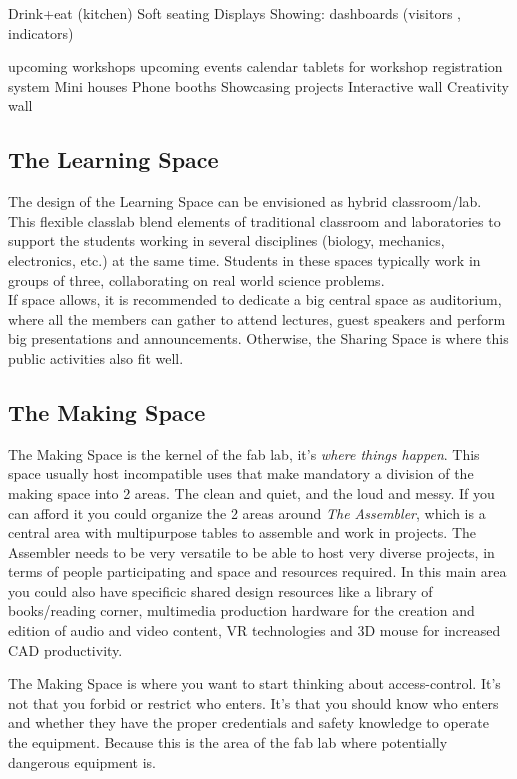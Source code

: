 \documentclass[a4paper,12pt,titlepage]{article}
\begin{document}
Drink+eat (kitchen)
Soft seating
Displays Showing: dashboards (visitors , indicators)

upcoming workshops
upcoming events
calendar
tablets for workshop registration system
Mini houses
Phone booths
Showcasing projects
Interactive wall
Creativity wall


\subsection{The Learning Space}
The design of the
Learning Space can be
envisioned as hybrid
classroom/lab.
This flexible
classlab blend
elements of traditional
classroom and
laboratories to
support the students working
in several disciplines
(biology, mechanics,
electronics, etc.) at the same time. Students in these spaces typically work in
groups of three, collaborating on real world science problems.\\ 

If space allows, it is recommended to dedicate a big central space as auditorium, where all the members can gather to attend
lectures, guest speakers and perform big presentations and announcements. Otherwise, the Sharing Space is where this public activities also fit well.



\subsection{The Making Space}
The Making Space is the kernel of the fab lab, it's \textit{where things happen}. This
space  usually host incompatible uses that make mandatory a division of the making space into 2 areas. The clean and quiet, and the loud and messy. If you can afford it you could organize the 2 areas around \textit{The
Assembler}, which is a central area with multipurpose tables to assemble and work in projects.
The Assembler needs to be very versatile to be able to host very diverse projects, in terms of
people participating and space and resources required. In this main area you could also have specificic shared design resources like a library of books/reading corner, multimedia production hardware for the creation and edition of audio and video content, VR technologies and 3D mouse for increased CAD productivity.

\begin{figure}[h]
\centering
{}
\end{figure}
The Making Space is where you want to start thinking about access-control. It's not that you forbid or restrict who enters. It's that you should know who enters and whether they have the proper credentials and safety knowledge to operate the equipment. Because this is the area of the fab lab where potentially dangerous equipment is.
\end{document}
